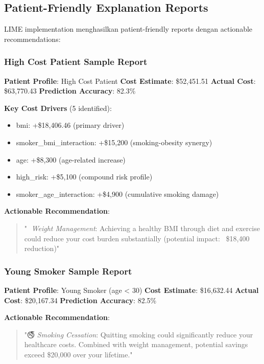 \subsection{Patient-Friendly Explanation Reports}
\label{subsec:lime-patient-reports}

LIME implementation menghasilkan patient-friendly reports dengan actionable recommendations:

\subsubsection{High Cost Patient Sample Report}

\textbf{Patient Profile}: High Cost Patient
\textbf{Cost Estimate}: \$52,451.51
\textbf{Actual Cost}: \$63,770.43
\textbf{Prediction Accuracy}: 82.3\%

\textbf{Key Cost Drivers} (5 identified):
\begin{itemize}
    \item bmi: +\$18,406.46 (primary driver)
    \item smoker\_bmi\_interaction: +\$15,200 (smoking-obesity synergy)
    \item age: +\$8,300 (age-related increase)
    \item high\_risk: +\$5,100 (compound risk profile)
    \item smoker\_age\_interaction: +\$4,900 (cumulative smoking damage)
\end{itemize}

\textbf{Actionable Recommendation}:
\begin{quote}
"🏃 \textit{Weight Management}: Achieving a healthy BMI through diet and exercise could reduce your cost burden substantially (potential impact: ~\$18,400 reduction)"
\end{quote}

\subsubsection{Young Smoker Sample Report}

\textbf{Patient Profile}: Young Smoker (age < 30)
\textbf{Cost Estimate}: \$16,632.44
\textbf{Actual Cost}: \$20,167.34
\textbf{Prediction Accuracy}: 82.5\%

\textbf{Actionable Recommendation}:
\begin{quote}
"🚭 \textit{Smoking Cessation}: Quitting smoking could significantly reduce your healthcare costs. Combined with weight management, potential savings exceed \$20,000 over your lifetime."
\end{quote}

